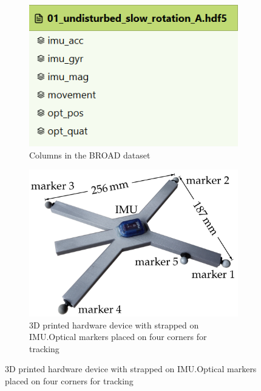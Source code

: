 \documentclass{iutbscthesis}
\begin{document}
\begin{figure}
    \centering

    \begin{subfigure}[t]{0.45\textwidth}
        \centering
        \includegraphics[width=\linewidth]{figures/dataset.png}
        \caption{Columns in the BROAD dataset}
        \label{fig:datase}
    \end{subfigure}
    \hfill
    \begin{subfigure}[t]{0.45\textwidth}
        \centering
        \includegraphics[width=\linewidth]{figures/imu_hardware_mount.png}
        \caption{3D printed hardware device with strapped on IMU.Optical markers placed on four corners for tracking}
        \label{fig:IMUhardware}
    \end{subfigure}
        
\end{figure}
\end{document}
